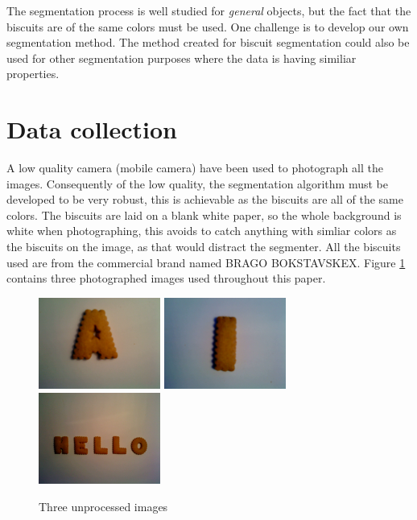 \documentclass[a4paper,11pt]{article}
\begin{document}
The segmentation process is well studied for \emph{general} objects, but the fact that the biscuits are of the same colors must be used.
One challenge is to develop our own segmentation method.
The method created for biscuit segmentation could also be used for other segmentation purposes where the data is having similiar properties.

\section{Data collection}
A low quality camera (mobile camera) have been used to photograph all the images.
Consequently of the low quality, the segmentation algorithm must be developed to be very robust, this is achievable as the biscuits are all of the same colors.
The biscuits are laid on a blank white paper, so the whole background is white when photographing, this avoids to catch anything with simliar colors as the biscuits on the image, as that would distract the segmenter.
All the biscuits used are from the commercial brand named BRAGO BOKSTAVSKEX.
Figure \ref{fig:unprocessed} contains three photographed images used throughout this paper.

\begin{figure}[]
\begin{center}
\includegraphics[width=40mm]{orig_a.JPG}
\includegraphics[width=40mm]{orig_i.JPG}
\includegraphics[width=40mm]{orig_word.JPG}
\end{center}
\caption{Three unprocessed images}
\label{fig:unprocessed}
\end{figure}
\end{document}
